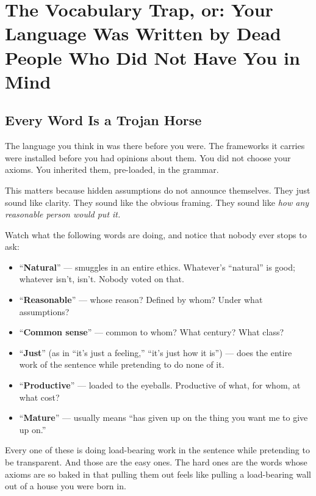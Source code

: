 \documentclass[11pt, letterpaper]{article}
\begin{document}
\section{The Vocabulary Trap, or: Your Language Was Written by Dead People Who Did Not Have You in Mind}

\subsection{Every Word Is a Trojan Horse}

The language you think in was there before you were. The frameworks it carries were installed before you had opinions about them. You did not choose your axioms. You inherited them, pre-loaded, in the grammar.

This matters because hidden assumptions do not announce themselves. They just sound like clarity. They sound like the obvious framing. They sound like \textit{how any reasonable person would put it.}

Watch what the following words are doing, and notice that nobody ever stops to ask:

\begin{itemize}[leftmargin=1.6em, itemsep=2pt]
  \item ``\textbf{Natural}'' --- smuggles in an entire ethics. Whatever's ``natural'' is good; whatever isn't, isn't. Nobody voted on that.
  \item ``\textbf{Reasonable}'' --- whose reason? Defined by whom? Under what assumptions?
  \item ``\textbf{Common sense}'' --- common to whom? What century? What class?
  \item ``\textbf{Just}'' (as in ``it's just a feeling,'' ``it's just how it is'') --- does the entire work of the sentence while pretending to do none of it.
  \item ``\textbf{Productive}'' --- loaded to the eyeballs. Productive of what, for whom, at what cost?
  \item ``\textbf{Mature}'' --- usually means ``has given up on the thing you want me to give up on.''
\end{itemize}

Every one of these is doing load-bearing work in the sentence while pretending to be transparent. And those are the easy ones. The hard ones are the words whose axioms are so baked in that pulling them out feels like pulling a load-bearing wall out of a house you were born in.
\end{document}
